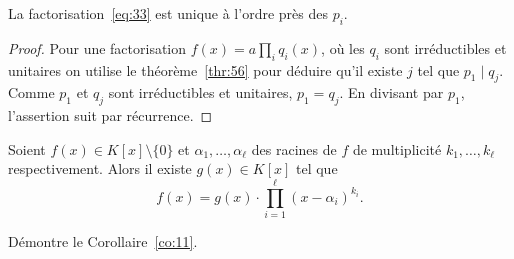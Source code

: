 \begin{theorem}
  \label{thr:57}
  La factorisation~\eqref{eq:33} est unique à l'ordre près des $p_i$. 
\end{theorem}

\begin{proof}
  Pour une  factorisation $f(x) = a ∏_i q_i(x)$, où les $q_i$ sont irréductibles et unitaires on utilise le théorème~\ref{thr:56} pour déduire qu'il  existe $j$ tel que  $p_1 \mid q_j$. Comme $p_1$ et $q_j$ sont  irréductibles et unitaires, $p_1 = q_j$. En divisant par $p_1$, l'assertion suit par récurrence. 
\end{proof}


\begin{corollary}
  \label{co:11}
  Soient $f(x) ∈ K[x] \setminus \{0\}$ et $α_1,\dots, α_ℓ$ des racines de $f$ de multiplicité $k_1,\dots,k_ℓ$ respectivement. Alors il existe $g(x)∈ K[x]$ tel que  
  \begin{displaymath}
    f(x) = g(x) ⋅ ∏_{i=1}^ℓ (x - α_i)^{k_i} .
  \end{displaymath}
\end{corollary}

\begin{exercise}
  Démontre le Corollaire~\ref{co:11}. 
\end{exercise}


